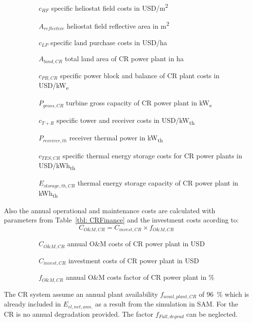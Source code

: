 \begin{itemize}
\item[ ] 
\begin{itemize}
\item[ ] 
\begin{itemize}
\item[$c_{HF}$]specific heliostat field costs in USD/m\textsuperscript{2}
\item[$A_{reflective}$]heliostat field reflective area in m\textsuperscript{2}
\item[$c_{LP}$]specific land purchase costs in USD/ha
\item[$A_{land,CR}$]total land area of CR power plant in ha
\item[$c_{PB,CR}$]specific power block and balance of CR plant costs in USD/kW\textsubscript{e}
\item[$P_{gross,CR}$]turbine gross capacity of CR power plant in kW\textsubscript{e}
\item[$c_{T+R}$]specific tower and receiver costs in USD/kW\textsubscript{th}
\item[$P_{receiver,th}$]receiver thermal power in kW\textsubscript{th}
\item[$c_{TES,CR}$]specific thermal energy storage costs for CR power plants in USD/kWh\textsubscript{th}
\item[$E_{storage,th,CR}$]thermal energy storage capacity of CR power plant in kWh\textsubscript{th}
\end{itemize}
\end{itemize}
\end{itemize}
Also the annual operational and maintenance costs are calculated with parameters from Table~\ref{tbl: CRFinance} and the investment costs acording to:
\begin{equation}
C_{O\&M,CR} = C_{invest,CR} \times f_{O\&M,CR}
\end{equation} 
\begin{itemize}
\item[ ] 
\begin{itemize}
\item[ ] 
\begin{itemize}
\item[$C_{O\&M,CR}$]annual O\&M costs of CR power plant in USD
\item[$C_{invest,CR}$]investment costs of CR power plant in USD
\item[$f_{O\&M,CR}$]annual O\&M costs factor of CR power plant in \%
\end{itemize}
\end{itemize}
\end{itemize}
The CR system assume an annual plant availability $f_{avail,plant,CR}$ of 96~\% which is already included in $E_{el,net,ann.}$ as a result from the simulation in SAM. For the CR is no annual degradation provided. The factor $f_{Full,degrad}$ can be neglected.
\pagebreak
